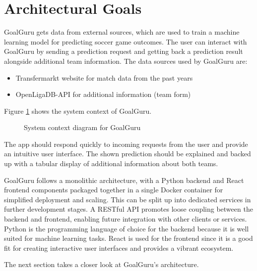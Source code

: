 \documentclass[conference,a4paper,flushend]{cs-techrep}
\begin{document}
\section{Architectural Goals} \label{architectural_goals} %
GoalGuru gets data from external sources, which are used to train a machine learning model for predicting soccer game outcomes. The user can interact with GoalGuru by sending a prediction request and getting back a prediction result alongside additional team information. The data sources used by GoalGuru are:
\begin{itemize}
\item Transfermarkt website for match data from the past years
\item OpenLigaDB-API for additional information (team form)
\end{itemize}
Figure \ref{systemcontext} shows the system context of GoalGuru.

\begin{figure}[ht]
\centering

\caption{System context diagram for GoalGuru}
\label{systemcontext}
\end{figure}

The app should respond quickly to incoming requests from the user and provide an intuitive user interface. The shown prediction should be explained and backed up with a tabular display of additional information about both teams.

GoalGuru follows a monolithic architecture, with a Python backend and React frontend components packaged together in a single Docker \cite{docker} container for simplified deployment and scaling. This can be split up into dedicated services in further development stages. A RESTful \cite{restful} API promotes loose coupling between the backend and frontend, enabling future integration with other clients or services. Python is the programming language of choice for the backend because it is well suited for machine learning tasks. React is used for the frontend since it is a good fit for creating interactive user interfaces and provides a vibrant ecosystem. 

The next section takes a closer look at GoalGuru's architecture.



\end{document}

